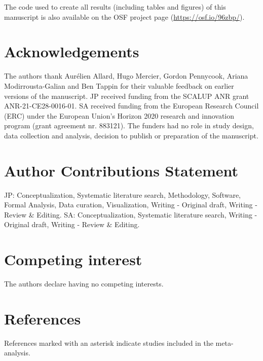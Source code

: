 \documentclass[
  doc,floatsintext]{apa6}
\begin{document}
The code used to create all results (including tables and figures) of this manuscript is also available on the OSF project page (\url{https://osf.io/96zbp/}).

\section{Acknowledgements}\label{acknowledgements}

The authors thank Aurélien Allard, Hugo Mercier, Gordon Pennycook, Ariana Modirrousta-Galian and Ben Tappin for their valuable feedback on earlier versions of the manuscript. JP received funding from the SCALUP ANR grant ANR-21-CE28-0016-01. SA received funding from the European Research Council (ERC) under the European Union's Horizon 2020 research and innovation program (grant agreement nr. 883121). The funders had no role in study design, data collection and analysis, decision to publish or preparation of the manuscript.

\section{Author Contributions Statement}\label{author-contributions-statement}

JP: Conceptualization, Systematic literature search, Methodology, Software, Formal Analysis, Data curation, Visualization, Writing - Original draft, Writing - Review \& Editing. SA: Conceptualization, Systematic literature search, Writing - Original draft, Writing - Review \& Editing.

\section{Competing interest}\label{competing-interest}

The authors declare having no competing interests.

\FloatBarrier

\newpage

\section{References}\label{references}

\begingroup
\setlength{\parindent}{-0.5in}
\setlength{\leftskip}{0.5in}

References marked with an asterisk indicate studies included in the meta-analysis.
\end{document}
